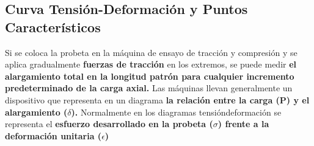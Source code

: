 \subsection{Curva Tensión-Deformación y Puntos Característicos}

Si se coloca la probeta en la máquina de ensayo de tracción y compresión y se aplica gradualmente \textbf{fuerzas de tracción} en los extremos, se puede medir \textbf{el alargamiento total en la longitud patrón para cualquier incremento predeterminado de la carga axial.} Las máquinas llevan generalmente un dispositivo que representa en un diagrama \textbf{la relación entre la carga (P) y el alargamiento ($\delta$).} Normalmente en los diagramas tensióndeformación se representa el \textbf{esfuerzo desarrollado en la probeta ($\sigma$) frente a la deformación unitaria ($\epsilon$)}

